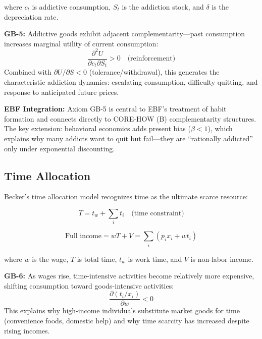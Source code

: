 where $c_t$ is addictive consumption, $S_t$ is the addiction stock, and $\delta$ is the depreciation rate.

\begin{axiom}
\label{ax:gb-5}
\textbf{GB-5:} Addictive goods exhibit adjacent complementarity---past consumption increases marginal utility of current consumption:
\begin{equation}
\frac{\partial^2 U}{\partial c_t \partial S_t} > 0 \quad \text{(reinforcement)}
\end{equation}
Combined with $\partial U/\partial S < 0$ (tolerance/withdrawal), this generates the characteristic addiction dynamics: escalating consumption, difficulty quitting, and response to anticipated future prices.
\end{axiom}

\textbf{EBF Integration:} Axiom GB-5 is central to EBF's treatment of habit formation and connects directly to CORE-HOW (B) complementarity structures. The key extension: behavioral economics adds present bias ($\beta < 1$), which explains why many addicts want to quit but fail---they are ``rationally addicted'' only under exponential discounting.

\subsection{Time Allocation}
\label{subsec:gb-time}

Becker's time allocation model \citep{PAP-becker1965theory} recognizes time as the ultimate scarce resource:

\begin{equation}
T = t_w + \sum_i t_i \quad \text{(time constraint)}
\label{eq:gb-time}
\end{equation}

\begin{equation}
\text{Full income} = wT + V = \sum_i (p_i x_i + w t_i)
\label{eq:gb-full-income}
\end{equation}

where $w$ is the wage, $T$ is total time, $t_w$ is work time, and $V$ is non-labor income.

\begin{axiom}
\label{ax:gb-6}
\textbf{GB-6:} As wages rise, time-intensive activities become relatively more expensive, shifting consumption toward goods-intensive activities:
\begin{equation}
\frac{\partial (t_i/x_i)}{\partial w} < 0
\end{equation}
This explains why high-income individuals substitute market goods for time (convenience foods, domestic help) and why time scarcity has increased despite rising incomes.
\end{axiom}

